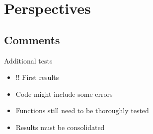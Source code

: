 \documentclass[10pt,table,dvipsnames,compress]{beamer}
\begin{document}
\section{Perspectives}
\label{sec:org0679fed}

\subsection{Comments}
\label{sec:orge22544d}

\begin{frame}[label={sec:org029531f}]{Additional tests}
\begin{itemize}
\item \alert{!! First results}
\item Code might include some errors
\item Functions still need to be thoroughly tested
\item Results must be consolidated
\end{itemize}
\end{frame}
\end{document}
